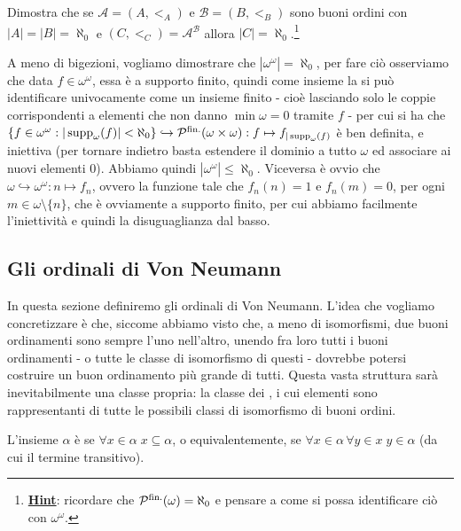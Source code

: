 \begin{exercise}
	Dimostra che se $\mathcal A = (A,<_A)$ e $\mathcal B = (B,<_B)$ sono buoni ordini con $|A| = |B| = \aleph_0$ e $(C,<_C) = \mathcal A^{\mathcal B}$ allora $|C| = \aleph_0$.\footnote{\underline{\textbf{Hint}}: ricordare che $\mathcal{P}^{\text{fin.}}(\omega) = \aleph_0$ e pensare a come si possa identificare ciò con $\omega^\omega$.}
\end{exercise}

\begin{soln}
	A meno di bigezioni, vogliamo dimostrare che $|\omega^\omega| = \aleph_0$, per fare ciò osserviamo che data $f \in \omega^\omega$, essa è a supporto finito, quindi come insieme la si può identificare univocamente come un insieme finito - cioè lasciando solo le coppie corrispondenti 
	a elementi che non danno $\min \omega = 0$ tramite $f$ - per cui si ha che $\{f \in \omega^\omega : |\operatorname{supp}_\omega(f)| < \aleph_0\} \hookrightarrow \mathcal{P}^{\text{fin.}}(\omega \times \omega) : f \mapsto f_{|\operatorname{supp}_\omega(f)}$ è ben definita, e iniettiva (per tornare indietro basta estendere il dominio a tutto $\omega$ ed associare ai nuovi elementi 0).
	Abbiamo quindi $|\omega^\omega| \leq \aleph_0$. Viceversa è ovvio che $\omega \hookrightarrow \omega^\omega : n \mapsto f_n$, ovvero la funzione tale che $f_n(n) = 1$ e $f_n(m) = 0$, per ogni $m \in \omega\setminus\{n\}$, che è ovviamente a supporto finito, per cui abbiamo facilmente l'iniettività e quindi la disuguaglianza dal basso.
\end{soln}

\newpage

\subsection{Gli ordinali di Von Neumann}
In questa sezione definiremo gli ordinali di Von Neumann. L'idea che vogliamo concretizzare è che, siccome abbiamo visto che, 
a meno di isomorfismi, due buoni ordinamenti sono sempre l'uno nell'altro, unendo fra loro tutti i buoni ordinamenti - o tutte le classe di isomorfismo 
di questi - dovrebbe potersi costruire un buon ordinamento più grande di tutti. Questa vasta struttura sarà inevitabilmente una classe propria:
la classe dei , i cui elementi sono rappresentanti di tutte le possibili classi di isomorfismo di buoni ordini.

\begin{definition}
	L'insieme $\alpha$ è  se $\forall x \in \alpha \; x \subseteq \alpha$, o equivalentemente, se $\forall x \in \alpha \, \forall y \in x \; y \in \alpha$ (da cui il termine transitivo).
\end{definition}


